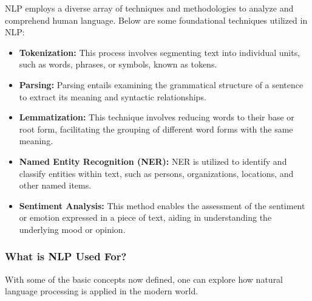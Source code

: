 NLP employs a diverse array of techniques and methodologies to analyze and comprehend human language. Below are some foundational techniques utilized in NLP:

\begin{itemize}
    \item \textbf{Tokenization:} This process involves segmenting text into individual units, such as words, phrases, or symbols, known as tokens.
    \item \textbf{Parsing:} Parsing entails examining the grammatical structure of a sentence to extract its meaning and syntactic relationships.
    \item \textbf{Lemmatization:} This technique involves reducing words to their base or root form, facilitating the grouping of different word forms with the same meaning.
    \item \textbf{Named Entity Recognition (NER):} NER is utilized to identify and classify entities within text, such as persons, organizations, locations, and other named items.
    \item \textbf{Sentiment Analysis:} This method enables the assessment of the sentiment or emotion expressed in a piece of text, aiding in understanding the underlying mood or opinion.
\end{itemize}

\subsubsection*{What is NLP Used For?}

With some of the basic concepts now defined, one can explore how natural language processing is applied in the modern world.

